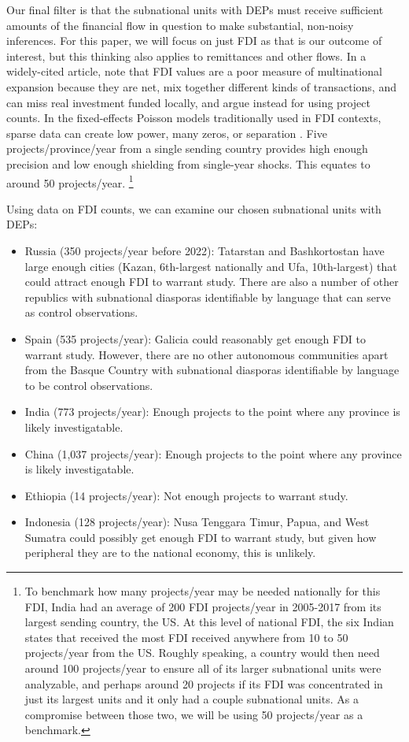 \documentclass[12pt]{article}
\begin{document}
    Our final filter is that the subnational units with DEPs must receive sufficient amounts of the financial flow in question to make substantial, non-noisy inferences. For this paper, we will focus on just FDI as that is our outcome of interest, but this thinking also applies to remittances and other flows. In a widely-cited article, \citet{desbordes_effects_2017} note that FDI values are a poor measure of multinational expansion because they are net, mix together different kinds of transactions, and can miss real investment funded locally, and argue instead for using project counts. In the fixed-effects Poisson models traditionally used in FDI contexts, sparse data can create low power, many zeros, or separation \citep{santos_silva_further_2011}. Five projects/province/year from a single sending country provides high enough precision and low enough shielding from single-year shocks. This equates to around 50 projects/year. \footnote{To benchmark how many projects/year may be needed nationally for this FDI, India had an average of 200 FDI projects/year in 2005-2017 from its largest sending country, the US. At this level of national FDI, the six Indian states that received the most FDI received anywhere from 10 to 50 projects/year from the US. Roughly speaking, a country would then need around 100 projects/year to ensure all of its larger subnational units were analyzable, and perhaps around 20 projects if its FDI was concentrated in just its largest units and it only had a couple subnational units. As a compromise between those two, we will be using 50 projects/year as a benchmark.} 
    
    Using \citet{unctad_world_2025} data on FDI counts, we can examine our chosen subnational units with DEPs:
        \begin{itemize}
        \item Russia (350 projects/year before 2022): Tatarstan and Bashkortostan have large enough cities (Kazan, 6th-largest nationally and Ufa, 10th-largest) that could attract enough FDI to warrant study. There are also a number of other republics with subnational diasporas identifiable by language that can serve as control observations.
        \item Spain (535 projects/year): Galicia could reasonably get enough FDI to warrant study. However, there are no other autonomous communities apart from the Basque Country with subnational diasporas identifiable by language to be control observations.
        \item India (773 projects/year): Enough projects to the point where any province is likely investigatable.
        \item China (1,037 projects/year): Enough projects to the point where any province is likely investigatable.
        \item Ethiopia (14 projects/year): Not enough projects to warrant study.
        \item Indonesia (128 projects/year): Nusa Tenggara Timur, Papua, and West Sumatra could possibly get enough FDI to warrant study, but given how peripheral they are to the national economy, this is unlikely.
    \end{itemize}
    
\end{document}
